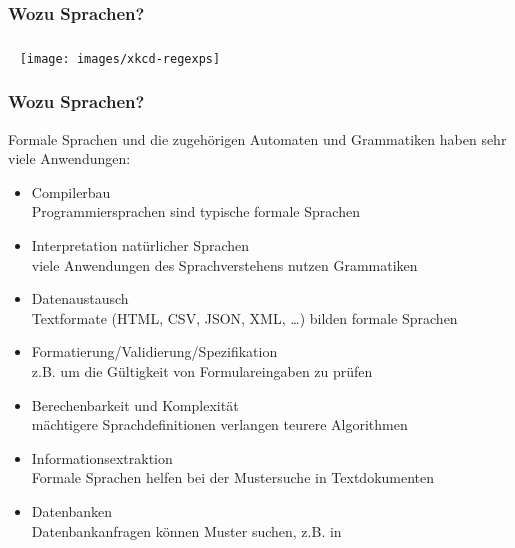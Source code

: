 \documentclass[aspectratio=1610,onlymath]{beamer}
\begin{document}





\begin{frame}\frametitle{Wozu Sprachen?}

\end{frame}

\begin{frame}\frametitle{}

~\hfill
\texttt{[image: images/xkcd-regexps]}
\hfill~

\end{frame}


\begin{frame}[fragile]\frametitle{Wozu Sprachen?}
\newcommand{\smaller}[1]{{\footnotesize #1}}

Formale Sprachen und die zugehörigen Automaten und Grammatiken haben sehr viele Anwendungen:

\begin{itemize}
\item \alert{Compilerbau}\\
	\smaller{Programmiersprachen sind typische formale Sprachen}
\item \alert{Interpretation natürlicher Sprachen}\\
	\smaller{viele Anwendungen des Sprachverstehens nutzen Grammatiken}
\item \alert{Datenaustausch}\\
	\smaller{Textformate (HTML, CSV, JSON, XML, \ldots) bilden formale Sprachen}
\item \alert{Formatierung/Validierung/Spezifikation}\\
	\smaller{z.B. um die Gültigkeit von Formulareingaben zu prüfen}
\item \alert{Berechenbarkeit und Komplexität}\\
	\smaller{mächtigere Sprachdefinitionen verlangen teurere Algorithmen}
\item \alert{Informationsextraktion}\\
	\smaller{Formale Sprachen helfen bei der Mustersuche in Textdokumenten}
\item \alert{Datenbanken}\\
	\smaller{Datenbankanfragen können Muster suchen, z.B. in \ghost{Graphdatenbanken}}
\end{itemize}

\end{frame}
\end{document}
